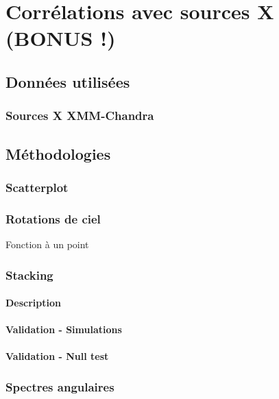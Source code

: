 
\chapter{Corrélations avec sources X (BONUS !)} %

\label{Chapter8} %



\section{Données utilisées}
\subsection{Sources X XMM-Chandra}

\section{Méthodologies}

\subsection{Scatterplot}
\subsection{Rotations de ciel}
Fonction à un point
\subsection{Stacking}
\subsubsection{Description}
\subsubsection{Validation - Simulations}
\subsubsection{Validation - Null test}

\subsection{Spectres angulaires}
